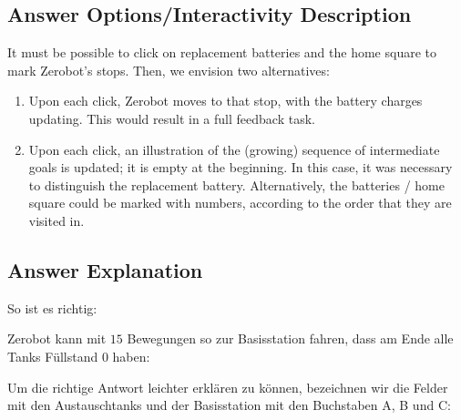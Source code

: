 \documentclass[a4paper,11pt]{report}
\newcommand{\taskGraphicsFolder}{..}
\begin{document}
\begingroup
\renewcommand{\arraystretch}{1.5}
\subsection*{Answer Options/Interactivity Description}

It must be possible to click on replacement batteries and the home square to mark Zerobot’s stops. Then, we envision two alternatives:

\begin{enumerate}
  \item Upon each click, Zerobot moves to that stop, with the battery charges updating. This would result in a full feedback task.
  \item Upon each click, an illustration of the (growing) sequence of intermediate goals is updated; it is empty at the beginning. In this case, it was necessary to distinguish the replacement battery. Alternatively, the batteries / home square could be marked with numbers, according to the order that they are visited in.
\end{enumerate}

\endgroup

\subsection*{Answer Explanation}

So ist es richtig:

{\centering%
\par}

Zerobot kann mit $15$ Bewegungen so zur Basisstation fahren, dass am Ende alle Tanks Füllstand $0$ haben:

{\centering%
\par}

Um die richtige Antwort leichter erklären zu können, bezeichnen wir die Felder mit den Austauschtanks und der Basisstation mit den Buchstaben A, B und C:
\end{document}
